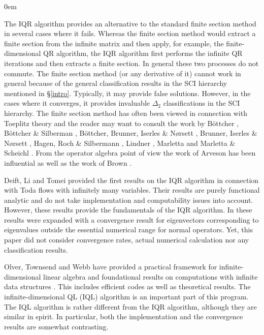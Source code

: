 \documentclass[a4paper,10pt]{article}
\begin{document}
\begin{labeling}{}
\itemsep0em
\item[\,\,\,{\it Finite sections}:]The IQR algorithm provides an alternative to the standard finite section method in several cases where it fails. Whereas the finite section method would extract a finite section from the infinite matrix and then apply, for example, the finite-dimensional QR algorithm, the IQR algorithm first performs the infinite QR iterations and then extracts a finite section. In general these two processes do not commute. The finite section method (or any derivative of it) cannot work in general because of the general classification results in the SCI hierarchy mentioned in \S \ref{intro}. Typically, it may provide false solutions. However, in the cases where it converges, it provides invaluable $\Delta_2$ classifications in the SCI hierarchy. The finite section method has often been viewed in connection with Toeplitz theory and the reader may want to consult the work by B{\"o}ttcher \cite{Albrecht_Fields, Bottcher_pseu}, B{\"o}ttcher \& Silberman \cite{Bottcher_book}, B{\"o}ttcher, Brunner, Iserles \& N{\o}rsett \cite{Arieh2}, Brunner, Iserles \& N{\o}rsett \cite{Arieh1}, Hagen, Roch \& Silbermann \cite{Silbermann22}, Lindner \cite{Lindner}, Marletta \cite{Marletta_pollution} and Marletta \& Scheichl \cite{Marletta_Spec_gaps}. From the operator algebra point of view the work of Arveson \cite{Arveson_cnum_lin94, Arveson_noncommute93,Arveson_role_of94} has been influential as well as the work of Brown \cite{brown2007quasi}.  

\item[\,\,\,{\it Infinite-dimensional Toda flow}:] Deift, Li and Tomei \cite{deift1985toda} provided the first results on the IQR algorithm in connection with Toda flows with infinitely many variables. Their results are purely functional analytic and do not take implementation and computability issues into account. However, these results provide the fundamentals of the IQR algorithm. In \cite{hansen2008} these results were expanded with a convergence result for eigenvectors corresponding to eigenvalues outside the essential numerical range for normal operators. Yet, this paper did not consider convergence rates, actual numerical calculation nor any classification results. 


\item[\,\,\,{\it Infinite-dimensional QL algorithm}:] Olver, Townsend and Webb have provided a practical framework for infinite-dimensional linear algebra and foundational results on computations with infinite data structures \cite{webb2017spectra,Olver_Townsend_Proceedings, Olver_SIAM_Rev, Olver_code1, Olver_code2}. This includes efficient codes as well as theoretical results. The infinite-dimensional QL (IQL) algorithm is an important part of this program. The IQL algorithm is rather different from the IQR algorithm, although they are similar in spirit. In particular, both the implementation and the convergence results are somewhat contrasting.  


\end{labeling}
\end{document}
